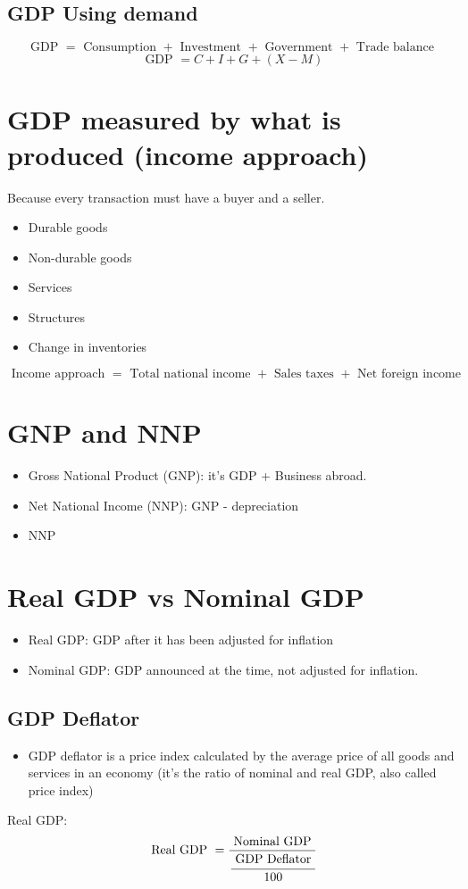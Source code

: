 \documentclass[openany]{book}
\begin{document}
\subsection{GDP Using demand}
\[
  \text{ GDP } = \text{ Consumption } + \text{ Investment } + \text{ Government } + \text{ Trade balance }
\]
\[
  \text{ GDP } = C + I + G + (X-M)
\]


\section{GDP measured by what is produced (income approach)}
Because every transaction must have a buyer and a seller. 
\begin{itemize}
    \item Durable goods 
    \item Non-durable goods
    \item Services 
    \item Structures 
    \item Change in inventories 
\end{itemize}
\[
  \text{ Income approach } = \text{ Total national income } + \text{ Sales taxes } + \text{ Net foreign income }
\]

\section{GNP and NNP}
\begin{itemize}
    \item Gross National Product (GNP): it's GDP + Business abroad. 
    \item Net National Income (NNP): GNP - depreciation
    \item NNP 
\end{itemize}
%
\section{Real GDP vs Nominal GDP}
\begin{itemize}
    \item Real GDP: GDP after it has been adjusted for inflation 
    \item Nominal GDP: GDP announced at the time, not adjusted for inflation. 
\end{itemize}
%
\subsection{GDP Deflator}
\begin{itemize}
    \item GDP deflator is a price index calculated by the average price of all goods and services in an economy (it's the ratio of nominal and real GDP, also called price index)
\end{itemize}
Real GDP: 
\[
    \text{ Real GDP } = \frac{\text{ Nominal GDP }}{\cfrac{\text{ GDP Deflator }}{100}} 
\]
\end{document}
